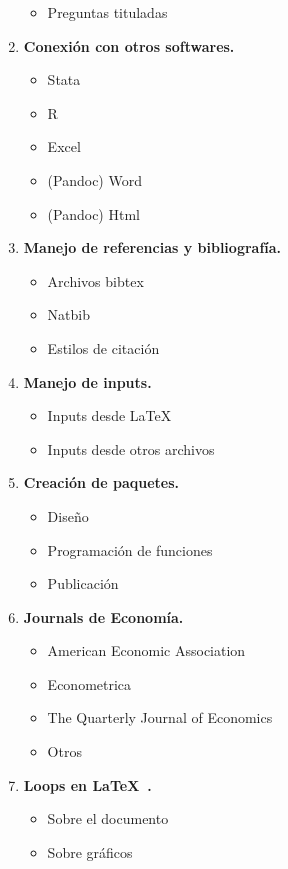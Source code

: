 \documentclass[11pt]{article}
\begin{document}
\begin{multicols}{2}
\begin{enumerate}[start=1,label={\bfseries \arabic*.},leftmargin=1cm]
\begin{itemize}
            \item Preguntas tituladas
        \end{itemize}
    \item \textbf{Conexión con otros softwares.}
        \begin{itemize}
            \item Stata 
            \item R
            \item Excel
            \item (Pandoc) Word
            \item (Pandoc) Html
        \end{itemize}
    \item \textbf{Manejo de referencias y bibliografía.}
        \begin{itemize}
            \item Archivos bibtex
            \item Natbib
            \item Estilos de citación
        \end{itemize}
    \item \textbf{Manejo de inputs.}
        \begin{itemize}
            \item Inputs desde \LaTeX
            \item Inputs desde otros archivos
        \end{itemize}
    \item \textbf{Creación de paquetes.}
        \begin{itemize}
            \item Diseño
            \item Programación de funciones
            \item Publicación
        \end{itemize}
    \item \textbf{Journals de Economía.}
        \begin{itemize}
            \item American Economic Association
            \item Econometrica
            \item The Quarterly Journal of Economics
            \item Otros
        \end{itemize}
    \item \textbf{Loops en \LaTeX\ .}
        \begin{itemize}
            \item Sobre el documento
            \item Sobre gráficos
        \end{itemize}
    
\end{enumerate}
\end{multicols}
\end{document}
